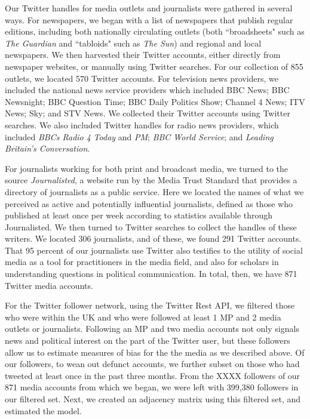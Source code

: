 \documentclass[12pt, letterpaper]{article}
\begin{document}
Our Twitter handles for media outlets and journalists were gathered in several ways. For newspapers, we began with a list of newspapers that publish regular editions, including both nationally circulating outlets (both ``broadsheets" such as \emph{The Guardian} and ``tabloids" such as \emph{The Sun}) and regional and local newspapers. We then harvested their Twitter accounts, either directly from newspaper websites, or manually using Twitter searches. For our collection of 855 outlets, we located 570 Twitter accounts. For television news providers, we included the national news service providers which included BBC News; BBC Newsnight; BBC Question Time; BBC Daily Politics Show; Channel 4 News; ITV News; Sky; and STV News. We collected their Twitter accounts using Twitter searches. We also included Twitter handles for radio news providers, which included \emph{BBCs Radio 4} \emph{Today} and \emph{PM}; \emph{BBC World Service}; and \emph{Leading Britain's Conversation}. 

For journalists working for both print and broadcast media, we turned to the source \emph{Journalisted}, a website run by the Media Trust Standard that provides a directory of journalists as a public service. Here we located the names of what we perceived as active and potentially influential journalists, defined as those who published at least once per week according to statistics available through Journalisted. We then turned to Twitter searches to collect the handles of these writers. We located 306 journalists, and of these, we found 291 Twitter accounts. That 95 percent of our journalists use Twitter also testifies to the utility of social media as a tool for practitioners in the media field, and also for scholars in understanding questions in political communication. In total, then, we have 871 Twitter media accounts.

For the Twitter follower network, using the Twitter Rest API, we filtered those who were within the UK and who were followed at least 1 MP and 2 media outlets or journalists. Following an MP and two media accounts not only signals news and political interest on the part of the Twitter user, but these followers allow us to estimate measures of bias for the the media as we described above. Of our followers, to wean out defunct accounts, we further subset on those who had tweeted at least once in the past three months. From the XXXX followers of our 871 media accounts from which we began, we were left with 399,380 followers in our filtered set. Next, we created an adjacency matrix using this filtered set, and estimated the model.
\end{document}

